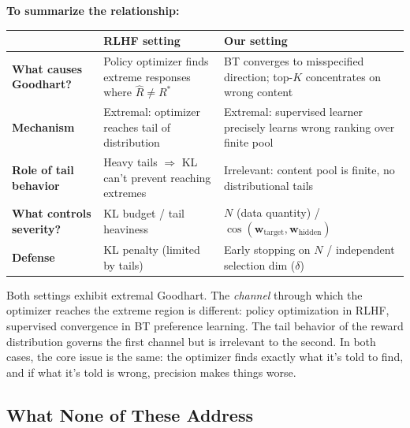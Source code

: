 \documentclass[11pt]{article}
\begin{document}
\textbf{To summarize the relationship:}
\begin{center}
\begin{tabular}{p{4cm}p{4cm}p{4cm}}
\toprule
& \textbf{RLHF setting} & \textbf{Our setting} \\
\midrule
\textbf{What causes Goodhart?}
  & Policy optimizer finds extreme responses where $\hat{R} \neq R^*$
  & BT converges to misspecified direction; top-$K$ concentrates on
    wrong content \\[6pt]
\textbf{Mechanism}
  & Extremal: optimizer reaches tail of distribution
  & Extremal: supervised learner precisely learns wrong ranking
    over finite pool \\[6pt]
\textbf{Role of tail behavior}
  & Heavy tails $\Rightarrow$ KL can't prevent reaching extremes
  & Irrelevant: content pool is finite, no distributional tails \\[6pt]
\textbf{What controls severity?}
  & KL budget / tail heaviness
  & $N$ (data quantity) / $\cos(\mathbf{w}_{\text{target}},
    \mathbf{w}_{\text{hidden}})$ \\[6pt]
\textbf{Defense}
  & KL penalty (limited by tails)
  & Early stopping on $N$ / independent selection dim ($\delta$) \\
\bottomrule
\end{tabular}
\end{center}

Both settings exhibit extremal Goodhart. The \emph{channel} through
which the optimizer reaches the extreme region is different: policy
optimization in RLHF, supervised convergence in BT preference learning.
The tail behavior of the reward distribution governs the first channel
but is irrelevant to the second. In both cases, the core issue is the
same: the optimizer finds exactly what it's told to find, and if what
it's told is wrong, precision makes things worse.

\subsection{What None of These Address}
\end{document}
